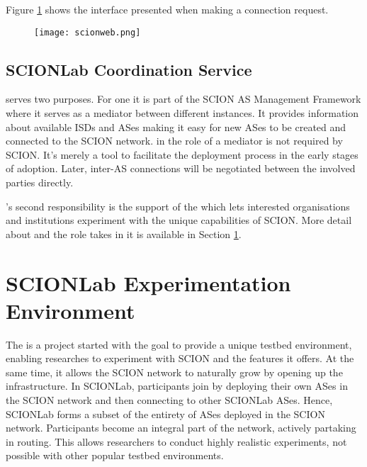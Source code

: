 Figure \ref{back:scionweb} shows the \lmi interface presented when making a connection request.

\begin{figure}
	\centering
	\centerline{\texttt{[image: scionweb.png]}}
	\label{back:scionweb}
\end{figure}

\subsection{SCIONLab Coordination Service}
\label{back_scion_coord}

 serves two purposes. For one it is part of the SCION AS Management Framework where it serves as a mediator between different \lmi instances. It provides information about available ISDs and ASes making it easy for new ASes to be created and connected to the SCION network. \lcs in the role of a mediator is not required by SCION. It's merely a tool to facilitate the deployment process in the early stages of adoption. Later, inter-AS connections will be negotiated between the involved parties directly. \cite[Chapter~10]{scion_book}

\lcs's second responsibility is the support of the \lee which lets interested organisations and institutions experiment with the unique capabilities of SCION. More detail about \lee and the role \lcs takes in it is available in Section \ref{back:scionlab}.

\section{SCIONLab Experimentation Environment}
\label{back:scionlab}

The \lee is a project started with the goal to provide a unique testbed environment, enabling researches to experiment with SCION and the features it offers. At the same time, it allows the SCION network to naturally grow by opening up the infrastructure. In SCIONLab, participants join by deploying their own ASes in the SCION network and then connecting to other SCIONLab ASes. Hence, SCIONLab forms a subset of the entirety of ASes deployed in the SCION network. Participants become an integral part of the network, actively partaking in routing. This allows researchers to conduct highly realistic experiments, not possible with other popular testbed environments. \cite[Chapter~10]{scion_book}


